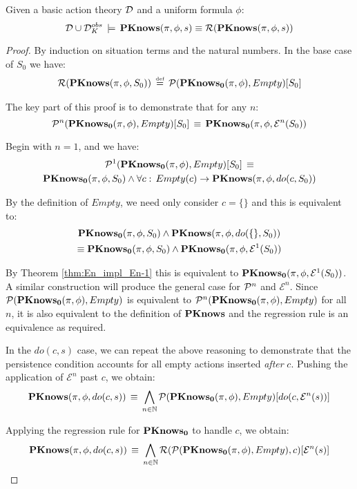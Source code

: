 \begin{thmext}
[\ref{thm:Reg_PKnows}] Given a basic action theory $\mathcal{D}$
and a uniform formula $\phi$:\[
\mathcal{D}\cup\mathcal{D}_{K}^{obs}\,\models\,\mathbf{PKnows}(\pi,\phi,s)\equiv\mathcal{R}(\mathbf{PKnows}(\pi,\phi,s))\]

\end{thmext}
\begin{proof}
By induction on situation terms and the natural numbers. In the base
case of $S_{0}$ we have:\begin{gather*}
\mathcal{R}(\mathbf{PKnows}(\pi,\phi,S_{0}))\,\stackrel{\mbox{\tiny def}}{=}\,\mathcal{P}(\mathbf{PKnows_{0}}(\pi,\phi),Empty)[S_{0}]\end{gather*}


The key part of this proof is to demonstrate that for any $n$:\[
\mathcal{P}^{n}(\mathbf{PKnows_{0}}(\pi,\phi),Empty)[S_{0}]\,\equiv\,\mathbf{PKnows_{0}}(\pi,\phi,\mathcal{E}^{n}(S_{0}))\]


Begin with $n=1$, and we have:\begin{multline*}
\mathcal{P}^{1}(\mathbf{PKnows_{0}}(\pi,\phi),Empty)[S_{0}]\,\equiv\\
\mathbf{PKnows_{0}}(\pi,\phi,S_{0})\wedge\forall c:\, Empty(c)\rightarrow\mathbf{PKnows}(\pi,\phi,do(c,S_{0}))\end{multline*}


By the definition of $Empty$, we need only consider $c=\{\}$ and
this is equivalent to:\begin{multline*}
\mathbf{PKnows_{0}}(\pi,\phi,S_{0})\wedge\mathbf{PKnows}(\pi,\phi,do(\{\},S_{0}))\\
\equiv\mathbf{PKnows_{0}}(\pi,\phi,S_{0})\wedge\mathbf{PKnows_{0}}(\pi,\phi,\mathcal{E}^{1}(S_{0}))\end{multline*}


By Theorem \ref{thm:En_impl_En-1} this is equivalent to $\mathbf{PKnows_{0}}(\pi,\phi,\mathcal{E}^{1}(S_{0}))$.
A similar construction will produce the general case for $\mathcal{P}^{n}$
and $\mathcal{E}^{n}$. Since $\mathcal{P}(\mathbf{PKnows_{0}}(\pi,\phi),Empty)$ is
equivalent to $\mathcal{P}^{n}(\mathbf{PKnows_{0}}(\pi,\phi),Empty)$ for all $n$,
it is also equivalent to the definition of $\mathbf{PKnows}$ and the regression
rule is an equivalence as required.

In the $do(c,s)$ case, we can repeat the above reasoning to demonstrate
that the persistence condition accounts for all empty actions inserted
\emph{after} $c$. Pushing the application of $\mathcal{E}^{n}$ past
$c$, we obtain:\[
\mathbf{PKnows}(\pi,\phi,do(c,s))\,\equiv\,\bigwedge_{n\in\mathbb{N}}\mathcal{P}(\mathbf{PKnows_{0}}(\pi,\phi),Empty)[do(c,\mathcal{E}^{n}(s))]\]


Applying the regression rule for $\mathbf{PKnows_{0}}$ to handle $c$, we obtain:\[
\mathbf{PKnows}(\pi,\phi,do(c,s))\,\equiv\,\bigwedge_{n\in\mathbb{N}}\mathcal{R}(\mathcal{P}(\mathbf{PKnows_{0}}(\pi,\phi),Empty),c)[\mathcal{E}^{n}(s)]\]



\end{proof}
